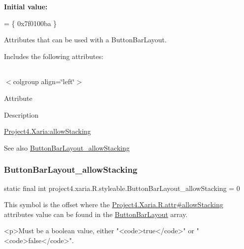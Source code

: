 {\bfseries Initial value\+:}
\begin{DoxyCode}
= \{
            0x7f0100ba
        \}
\end{DoxyCode}
Attributes that can be used with a Button\+Bar\+Layout. 

Includes the following attributes\+:

\tabulinesep=1mm
\begin{longtabu} spread 0pt [c]{*{0}{|X[-1]}|}
\hline
\end{longtabu}
$<$colgroup align=\char`\"{}left\char`\"{}$>$ 

Attribute

Description 

{\ttfamily \hyperlink{classproject4_1_1xaria_1_1R_1_1styleable_a6ef4a258dc721188ad3bda92997bfbb9}{Project4.\+Xaria\+:allow\+Stacking}}

\begin{DoxySeeAlso}{See also}
\hyperlink{classproject4_1_1xaria_1_1R_1_1styleable_a6ef4a258dc721188ad3bda92997bfbb9}{Button\+Bar\+Layout\+\_\+allow\+Stacking} 
\end{DoxySeeAlso}
\mbox{\label{classproject4_1_1xaria_1_1R_1_1styleable_a6ef4a258dc721188ad3bda92997bfbb9}} 
\subsubsection{\texorpdfstring{Button\+Bar\+Layout\+\_\+allow\+Stacking}{ButtonBarLayout\_allowStacking}}
{\footnotesize\ttfamily static final int project4.\+xaria.\+R.\+styleable.\+Button\+Bar\+Layout\+\_\+allow\+Stacking = 0\hspace{0.3cm}{\ttfamily [static]}}

This symbol is the offset where the \hyperlink{}{Project4.\+Xaria.\+R.\+attr\#allow\+Stacking} attribute\textquotesingle{}s value can be found in the \hyperlink{classproject4_1_1xaria_1_1R_1_1styleable_ad7c5e25ea8375a04aba691097eab654d}{Button\+Bar\+Layout} array.

\begin{DoxyVerb}      <p>Must be a boolean value, either "<code>true</code>" or "<code>false</code>".
\end{DoxyVerb}
 

